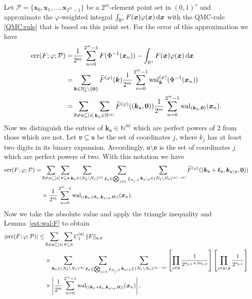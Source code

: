 \documentclass[namedate,webpdf,imanum]{ima-authoring-arxiv}%
\theoremstyle{thmstyletwo}%
\numberwithin{equation}{section}
\newcommand{\rd}{\, {\rm d}}
\newcommand{\wal}{{\rm wal}}
\newcommand{\bsx}{\boldsymbol{x}}
\newcommand{\bsk}{\boldsymbol{k}}
\newcommand{\bsell}{\boldsymbol{\ell}}
\newcommand{\bszero}{\boldsymbol{0}}
\newcommand{\uu}{\mathfrak{u}}
\newcommand{\vv}{\mathfrak{v}}
\newcommand{\NN}{\mathbb{N}}
\newcommand{\RR}{\mathbb{R}}
\newcommand{\cP}{\mathcal{P}}
\begin{document}
Let $\cP=\{\bsx_0,\bsx_1,\ldots,\bsx_{2^m-1}\}$ be a $2^m$-element point set in $(0,1)^s$ and approximate the $\varphi$-weighted integral $\int_{\RR^s}F(\bsx) \varphi(\bsx) \rd \bsx$ with the QMC-rule \eqref{QMC:rule} that is based on this point set. For the error of this approximation we have
\begin{align*}
{\rm err}(F;\varphi;\cP) = & \frac{1}{2^m} \sum_{n=0}^{2^m-1} F(\Phi^{-1}(\bsx_n))-\int_{\RR^s}F(\bsx) \varphi(\bsx) \rd \bsx    \\
= & \sum_{\bsk \in \NN_0^s\setminus\{\bszero\}} \widetilde{F}^{(\varphi)}(\bsk) \frac{1}{2^m} \sum_{n=0}^{2^m-1} \wal_{\bsk}^{(\varphi)}(\Phi^{-1}(\bsx_n))\\
= & \sum_{\emptyset \not= \uu \subseteq [s]} \sum_{\bsk_\uu \in \NN^{|\uu|}} \widetilde{F}^{(\varphi)}((\bsk_\uu,\bszero)) \frac{1}{2^m} \sum_{n=0}^{2^m-1} \wal_{(\bsk_\uu,\bszero)}(\bsx_n).
\end{align*}
Now we distinguish the entries of $\bsk_\uu \in \NN^{|\uu|}$ which are perfect powers of 2 from those which are not. Let $\vv \subseteq \uu$ be the set of coordinates $j$, where $k_j$ has at least two digits in its binary expansion. Accordingly, $\uu \setminus \vv$ is the set of coordinates $j$ which are perfect powers of two. With this notation we have
\begin{align*}
{\rm err}(F;\varphi;\cP) = & \sum_{\emptyset \not= \uu \subseteq [s]} \sum_{\vv \subseteq \uu} \sum_{\bsk_\vv \in (N_2 \setminus N_1)^{|\vv|}} \sum_{\bsell_\vv \in \bigotimes_{j\in \vv} L_{k_j,2}} \sum_{\bsk_{\uu \setminus \vv} \in (N_1 \setminus N_0)^{|\uu|-|\vv|}} \widetilde{F}^{(\varphi)}((\bsk_\vv+\bsell_\vv,\bsk_{\uu \setminus \vv},\bszero)) \\
& \times \frac{1}{2^m} \sum_{n=0}^{2^m-1} \wal_{((\bsk_\vv+\bsell_\vv,\bsk_{\uu \setminus \vv},\bszero))}(\bsx_n).
\end{align*}
Now we take the absolute value and apply the triangle inequality and Lemma~\ref{est:wal:F} to obtain
\begin{align*}
|{\rm err}(F;\varphi;\cP)| \le & \sum_{\emptyset \not= \uu \subseteq [s]} \sum_{\vv \subseteq \uu} C_1^{|\uu|} \, \|F\|_{\uu, \vv}\\
& \times \sum_{\bsk_\vv \in (N_2 \setminus N_1)^{|\vv|}} \sum_{\bsell_\vv \in \bigotimes_{j\in \vv} L_{k_j,2}} \sum_{\bsk_{\uu \setminus \vv} \in (N_1 \setminus N_0)^{|\uu|-|\vv|}}
\left[\prod_{j \in \vv}  \frac{1}{2^{a_{j,1} + \beta a_{j,2}}}\right] \left[ \prod_{j \in \uu \setminus \vv} \frac{1}{2^{a_{j,1}}}\right] \\
& \times \left|\frac{1}{2^m} \sum_{n=0}^{2^m-1} \wal_{((\bsk_\vv+\bsell_\vv,\bsk_{\uu \setminus \vv},\bszero))}(\bsx_n)\right|,
\end{align*}
\end{document}
